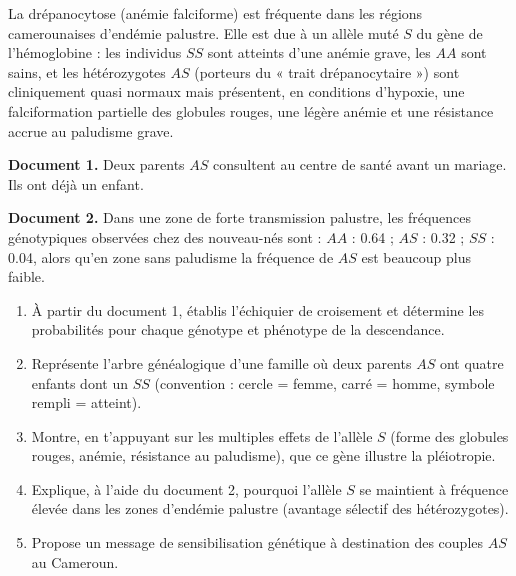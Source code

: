 \documentclass[11pt]{article}
\begin{document}
\begin{exercice}
La drépanocytose (anémie falciforme) est fréquente dans les régions camerounaises d'endémie palustre. Elle est due à un allèle muté $S$ du gène de l'hémoglobine : les individus $SS$ sont atteints d'une anémie grave, les $AA$ sont sains, et les hétérozygotes $AS$ (porteurs du « trait drépanocytaire ») sont cliniquement quasi normaux mais présentent, en conditions d'hypoxie, une falciformation partielle des globules rouges, une légère anémie et une résistance accrue au paludisme grave.

\textbf{Document 1.} Deux parents $AS$ consultent au centre de santé avant un mariage. Ils ont déjà un enfant.

\textbf{Document 2.} Dans une zone de forte transmission palustre, les fréquences génotypiques observées chez des nouveau-nés sont : $AA$ : \num{0,64} ; $AS$ : \num{0,32} ; $SS$ : \num{0,04}, alors qu'en zone sans paludisme la fréquence de $AS$ est beaucoup plus faible.
\begin{enumerate}
\item À partir du document 1, établis l'échiquier de croisement et détermine les probabilités pour chaque génotype et phénotype de la descendance.
\item Représente l'arbre généalogique d'une famille où deux parents $AS$ ont quatre enfants dont un $SS$ (convention : cercle = femme, carré = homme, symbole rempli = atteint).
\item Montre, en t'appuyant sur les multiples effets de l'allèle $S$ (forme des globules rouges, anémie, résistance au paludisme), que ce gène illustre la pléiotropie.
\item Explique, à l'aide du document 2, pourquoi l'allèle $S$ se maintient à fréquence élevée dans les zones d'endémie palustre (avantage sélectif des hétérozygotes).
\item Propose un message de sensibilisation génétique à destination des couples $AS$ au Cameroun.
\end{enumerate}
\end{exercice}
\end{document}
